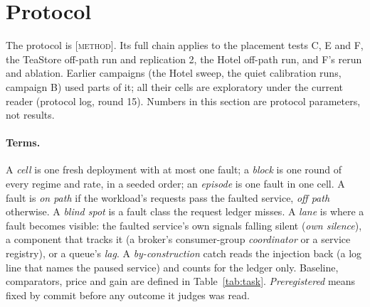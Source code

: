 \documentclass{ceurart}
\newcommand{\scope}[1]{\textsc{[#1]}}
\begin{document}
\section{Protocol}\label{sec:protocol}
The protocol is \scope{method}. Its full chain applies to the placement tests C, E and F, the TeaStore off-path run and replication 2, the Hotel
off-path run, and F's rerun and ablation. Earlier campaigns (the Hotel sweep, the quiet calibration runs, campaign B) used parts of it; all their cells
are exploratory under the current reader (protocol log, round 15). Numbers in this section are protocol parameters, not results.

\paragraph{Terms.} A \emph{cell} is one fresh deployment with at most one fault; a \emph{block} is one round of every regime
and rate, in a seeded order; an \emph{episode} is one fault in one cell. A fault is \emph{on path} if the workload's requests
pass the faulted service, \emph{off path} otherwise. A \emph{blind spot} is a fault class the request ledger misses. A
\emph{lane} is where a fault becomes visible: the faulted service's own signals falling silent (\emph{own silence}), a
component that tracks it (a broker's consumer-group \emph{coordinator} or a service registry), or a queue's \emph{lag}. A
\emph{by-construction} catch reads the injection back (a log line that names the paused service) and counts for the ledger
only. Baseline, comparators, price and gain are defined in Table~\ref{tab:task}. \emph{Preregistered} means fixed by commit before any outcome it judges was read.
\end{document}
